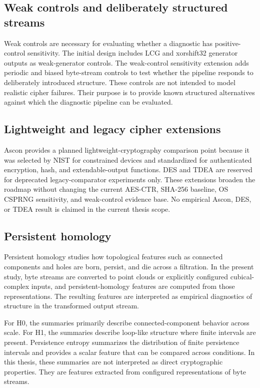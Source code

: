 \subsection{Weak controls and deliberately structured streams}
\label{subsec:weak-controls-background}

Weak controls are necessary for evaluating whether a diagnostic has positive-control sensitivity. The initial design includes LCG and xorshift32 generator outputs as weak-generator controls. The weak-control sensitivity extension adds periodic and biased byte-stream controls to test whether the pipeline responds to deliberately introduced structure. These controls are not intended to model realistic cipher failures. Their purpose is to provide known structured alternatives against which the diagnostic pipeline can be evaluated.

\subsection{Lightweight and legacy cipher extensions}
\label{subsec:lightweight-legacy-background}

Ascon provides a planned lightweight-cryptography comparison point because it was selected by NIST for constrained devices and standardized for authenticated encryption, hash, and extendable-output functions. DES and TDEA are reserved for deprecated legacy-comparator experiments only. These extensions broaden the roadmap without changing the current AES-CTR, SHA-256 baseline, OS CSPRNG sensitivity, and weak-control evidence base. No empirical Ascon, DES, or TDEA result is claimed in the current thesis scope.

\subsection{Persistent homology}
\label{subsec:persistent-homology-background}

Persistent homology studies how topological features such as connected components and holes are born, persist, and die across a filtration. In the present study, byte streams are converted to point clouds or explicitly configured cubical-complex inputs, and persistent-homology features are computed from those representations. The resulting features are interpreted as empirical diagnostics of structure in the transformed output stream.

For H0, the summaries primarily describe connected-component behavior across scale. For H1, the summaries describe loop-like structure where finite intervals are present. Persistence entropy summarizes the distribution of finite persistence intervals and provides a scalar feature that can be compared across conditions. In this thesis, these summaries are not interpreted as direct cryptographic properties. They are features extracted from configured representations of byte streams.

